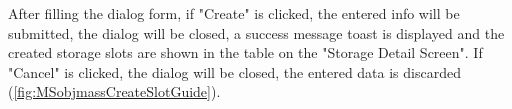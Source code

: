 After filling the dialog form, if "Create" is clicked, the entered info will be submitted, the dialog will be closed, a success message toast is displayed and the created storage slots are shown in the table on the "Storage Detail Screen". If "Cancel" is clicked, the dialog will be closed, the entered data is discarded (\autoref{fig:MSobjmassCreateSlotGuide}).

\begin{figure}[htb!] %
	\centering

    \vspace{10pt}
    \hspace{5pt}


\end{figure}
